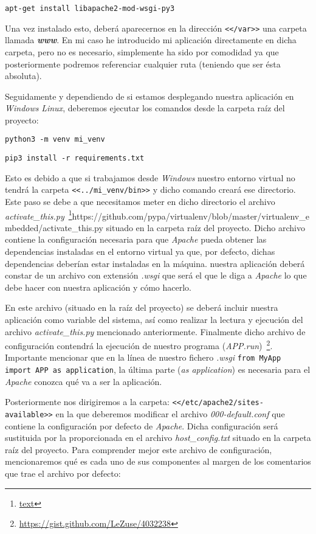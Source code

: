 \noindent\verb|apt-get install libapache2-mod-wsgi-py3|

Una vez instalado esto, deberá aparecernos en la dirección \texttt{<</var>>} una carpeta llamada \textbf{\textit{www}}. En mi caso he introducido mi aplicación directamente en dicha carpeta, pero no es necesario, simplemente ha sido por comodidad ya que posteriormente podremos referenciar cualquier ruta (teniendo que ser ésta absoluta).

Seguidamente y dependiendo de si estamos desplegando nuestra aplicación en \textit{Windows} \textit{Linux}, deberemos ejecutar los comandos desde la carpeta raíz del proyecto:

\noindent\verb|python3 -m venv mi_venv|

\noindent\verb|pip3 install -r requirements.txt|

Esto es debido a que si trabajamos desde \textit{Windows} nuestro entorno virtual no tendrá la carpeta \texttt{<<../mi\_venv/bin>>} y dicho comando creará ese directorio. Este paso se debe a que necesitamos meter en dicho directorio el archivo \textit{activate\_this.py}~\footnote{\url{text}}https://github.com/pypa/virtualenv/blob/master/virtualenv\_embedded/activate\_this.py situado en la carpeta raíz del proyecto. Dicho archivo contiene la configuración necesaria para que \textit{Apache} pueda obtener las dependencias instaladas en el entorno virtual ya que, por defecto, dichas dependencias deberían estar instaladas en la máquina. nuestra aplicación deberá constar de un archivo con extensión \textit{.wsgi} que será el que le diga a \textit{Apache} lo que debe hacer con nuestra aplicación y cómo hacerlo.

En este archivo (situado en la raíz del proyecto) se deberá incluir nuestra aplicación como variable del sistema, así como realizar la lectura y ejecución del archivo \textit{activate\_this.py} mencionado anteriormente. Finalmente dicho archivo de configuración contendrá la ejecución de nuestro programa (\textit{APP.run})~\footnote{\url{https://gist.github.com/LeZuse/4032238}}. Importante mencionar que en la línea de nuestro fichero \textit{.wsgi} \noindent\verb|from MyApp import APP as application|, la última parte (\textit{as application}) es necesaria para el \textit{Apache} conozca qué va a ser la aplicación.

Posteriormente nos dirigiremos a la carpeta: \texttt{<</etc/apache2/sites-available>>} en la que deberemos modificar el archivo \textit{000-default.conf} que contiene la configuración por defecto de \textit{Apache}. Dicha configuración será sustituida por la proporcionada en el archivo \textit{host\_config.txt} situado en la carpeta raíz del proyecto. Para comprender mejor este archivo de configuración, mencionaremos qué es cada uno de sus componentes al margen de los comentarios que trae el archivo por defecto:

